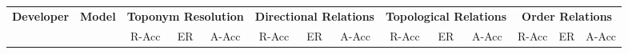 \begin{table*}[ht]
    \centering
    \begin{tabular}{l|lccc|ccc|ccc|ccc}
    \hline
    \hline
        \multicolumn{1}{l}{\multirow{2}{*}{\textbf{Developer}}} &
        \multicolumn{1}{|l}{\multirow{2}{*}{\textbf{Model}}} &

        \multicolumn{3}{c}{\textbf{Toponym Resolution}} & 
        \multicolumn{3}{|c}{\textbf{Directional Relations}} & 
        \multicolumn{3}{|c}{\textbf{Topological Relations}} & 
        \multicolumn{3}{|c}{\textbf{Order Relations}}  \\
        ~ & ~ & R-Acc & ER & A-Acc & R-Acc & ER & A-Acc & R-Acc & ER & A-Acc & R-Acc & ER & A-Acc \\
        

\end{tabular}
\end{table*}
